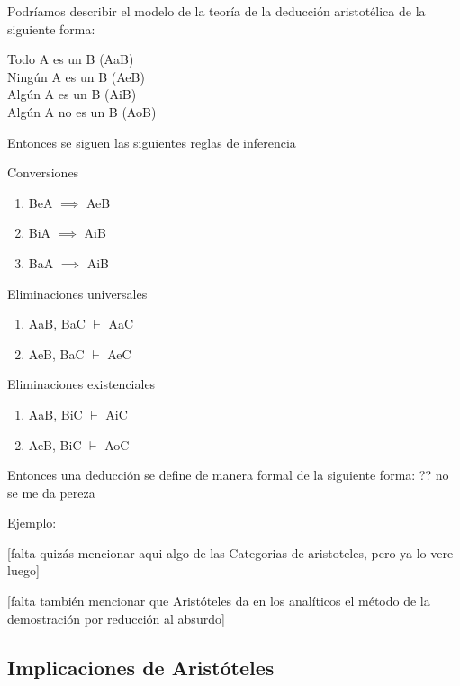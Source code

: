 \documentclass{article}
\begin{document}
Podríamos describir el modelo de la teoría de la deducción aristotélica de la siguiente forma:

\begin{displayquote}
Todo A es un B (AaB)\\
Ningún A es un B (AeB)\\
Algún A es un B (AiB)\\
Algún A no es un B (AoB)\\
\end{displayquote}

Entonces se siguen las siguientes reglas de inferencia

Conversiones

\begin{enumerate}
    \item BeA $\implies$ AeB
    \item BiA $\implies$ AiB
    \item BaA $\implies$ AiB
\end{enumerate}

Eliminaciones universales

\begin{enumerate}
    \item AaB, BaC $\vdash$ AaC
    \item AeB, BaC $\vdash$ AeC
\end{enumerate}

Eliminaciones existenciales

\begin{enumerate}
    \item AaB, BiC $\vdash$ AiC
    \item AeB, BiC $\vdash$ AoC
\end{enumerate}

Entonces una deducción se define de manera formal de la siguiente forma: ?? no se me da pereza

Ejemplo:

\cite{corcoran2009aristotle,smith1989prior}

[falta quizás mencionar aqui algo de las Categorias de aristoteles, pero ya lo vere luego]

[falta también mencionar que Aristóteles da en los analíticos el método de la demostración por reducción al absurdo]


\subsection{Implicaciones de Aristóteles}
\end{document}
